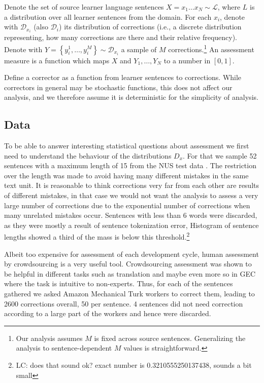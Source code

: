 \documentclass[english]{article}
\newcommand{\lc}[1]{\footnote{\color{green}LC: #1}}
\begin{document}
Denote the set of source learner language sentences $X=x_{1}\ldots x_N \sim \mathcal{L}$, where
$L$ is a distribution over all learner sentences from the domain. For each $x_i$, denote
with $\mathcal{D}_{x_i}$ (also $\mathcal{D}_i$) its distribution of corrections (i.e., a discrete
distribution representing, how many corrections are there and their relative frequency).
Denote with $Y = \left\{y_{i}^{1},\ldots, y_{i}^{M}\right\} \sim \mathcal{D}_{x_i}$
a sample of $M$ corrections.\footnote{Our analysis assumes $M$ is fixed across source sentences.
  Generalizing the analysis to sentence-dependent $M$ values is straightforward.}
An assessment measure is a function which maps $X$ and $Y_1,\ldots,Y_N$ to
a number in $[0,1]$.

Define a corrector as a function from learner sentences to corrections. While correctors
in general may be stochastic functions, this does not affect our analysis, and we therefore
assume it is deterministic for the simplicity of analysis.


\subsection{Data}

To be able to answer interesting statistical questions about assessment we first
need to understand the behaviour of the distributions $D_x$. For that we sample
52 sentences with a maximum length of 15 from the NUS test data
\cite{dahlmeier2013building}. The restriction over the length was made to avoid having many different mistakes in the same text unit. It is reasonable to think corrections very far from each other are results of different mistakes, in that case we would not want the analysis to assess a very large number of corrections due to the exponential number of corrections when many unrelated mistakes occur.
Sentences with less than 6 words were discarded, as they were
mostly a result of sentence tokenization error,
Histogram of sentence lengths showed a third of the mass is below this threshold.\lc{does that sound ok? exact number is 0.3210555250137438, sounds a bit small}

Albeit too expensive for assessment of each development cycle, human assessment
by crowdsourcing is a very useful tool. Crowdsourcing assessment was shown to
be helpful in different tasks such as translation
\cite{zaidan2011crowdsourcing,post2012constructing,graham2015improved}
and maybe even more so in GEC \cite{madnani2011they} where the task is intuitive to non-experts.
Thus, for each of the sentences gathered we asked Amazon Mechanical Turk workers to correct them, leading to 2600 corrections overall,
50 per sentence. 4 sentences did not need correction according to a large part of the workers and hence were discarded.
\end{document}
